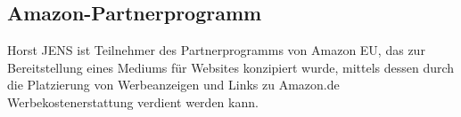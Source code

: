 \subsection*{Amazon-Partnerprogramm}
Horst JENS ist Teilnehmer des Partnerprogramms von Amazon EU, das zur Bereitstellung eines Mediums für Websites konzipiert wurde, mittels dessen durch die Platzierung von Werbeanzeigen und Links zu Amazon.de Werbekostenerstattung verdient werden kann.
